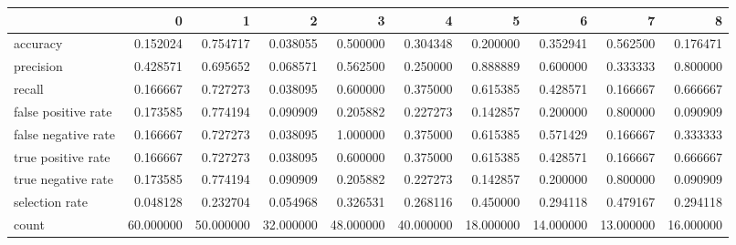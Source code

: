 \begin{tabular}{lrrrrrrrrr}
\toprule
{} &          0 &          1 &          2 &          3 &          4 &          5 &          6 &          7 &          8 \\
\midrule
accuracy            &   0.152024 &   0.754717 &   0.038055 &   0.500000 &   0.304348 &   0.200000 &   0.352941 &   0.562500 &   0.176471 \\
precision           &   0.428571 &   0.695652 &   0.068571 &   0.562500 &   0.250000 &   0.888889 &   0.600000 &   0.333333 &   0.800000 \\
recall              &   0.166667 &   0.727273 &   0.038095 &   0.600000 &   0.375000 &   0.615385 &   0.428571 &   0.166667 &   0.666667 \\
false positive rate &   0.173585 &   0.774194 &   0.090909 &   0.205882 &   0.227273 &   0.142857 &   0.200000 &   0.800000 &   0.090909 \\
false negative rate &   0.166667 &   0.727273 &   0.038095 &   1.000000 &   0.375000 &   0.615385 &   0.571429 &   0.166667 &   0.333333 \\
true positive rate  &   0.166667 &   0.727273 &   0.038095 &   0.600000 &   0.375000 &   0.615385 &   0.428571 &   0.166667 &   0.666667 \\
true negative rate  &   0.173585 &   0.774194 &   0.090909 &   0.205882 &   0.227273 &   0.142857 &   0.200000 &   0.800000 &   0.090909 \\
selection rate      &   0.048128 &   0.232704 &   0.054968 &   0.326531 &   0.268116 &   0.450000 &   0.294118 &   0.479167 &   0.294118 \\
count               &  60.000000 &  50.000000 &  32.000000 &  48.000000 &  40.000000 &  18.000000 &  14.000000 &  13.000000 &  16.000000 \\
\bottomrule
\end{tabular}

